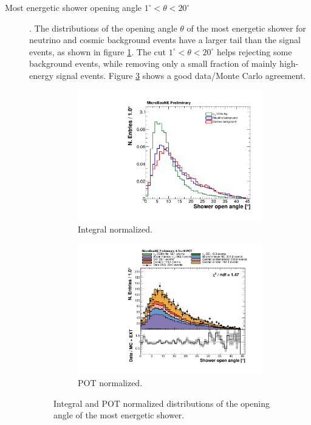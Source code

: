 \begin{description}
\item[Most energetic shower opening angle $1^{\circ} < \theta < 20^{\circ}$]. The distributions of the opening angle $\theta$ of the most energetic shower for neutrino and cosmic background events have a larger tail than the signal events, as shown in figure \ref{fig:open_integral}. The cut $1^{\circ} < \theta < 20^{\circ}$ helps rejecting some background events, while removing only a small fraction of mainly high-energy signal events. Figure \ref{fig:open_pot} shows a good data/Monte Carlo agreement.

\begin{figure}[htbp]
\centering
  \begin{subfigure}{0.45\textwidth}
    \includegraphics[width=\linewidth]{figures/h_shower_open_angle_norm.pdf}
    \caption{Integral normalized.} \label{fig:open_integral}
  \end{subfigure}
    \begin{subfigure}{0.45\textwidth}
    \includegraphics[width=\linewidth]{figures/h_shower_open_angle.pdf}
    \caption{POT normalized.} \label{fig:open_pot}
  \end{subfigure}
  \caption{Integral and POT normalized distributions of the opening angle of the most energetic shower.}
\end{figure}


\end{description}

